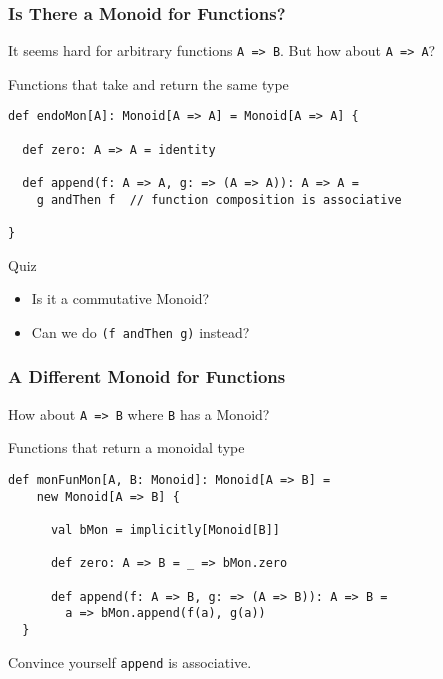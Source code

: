 \documentclass{beamer}
\begin{document}
\begin{frame}[fragile]\frametitle{Is There a Monoid for Functions?}
  It seems hard for arbitrary functions \texttt{A => B}.
  \pause
  But how about \alert{\texttt{A => A}}?

  \pause
  \begin{block}{Functions that take and return the same type}

  \begin{lstlisting}
def endoMon[A]: Monoid[A => A] = Monoid[A => A] {

  def zero: A => A = identity

  def append(f: A => A, g: => (A => A)): A => A =
    g andThen f  // function composition is associative

}
  \end{lstlisting}
  \end{block}
  \begin{block}{Quiz}
    \begin{itemize}
      \item Is it a commutative Monoid?
      \item Can we do \texttt{(f andThen g)} instead?
    \end{itemize}
  \end{block}
\end{frame}


\begin{frame}[fragile]
  \frametitle{A Different Monoid for Functions}
  How about \texttt{A => B} where \alert{\texttt{B} has a Monoid?}

  \begin{block}{Functions that return a monoidal type}
  \begin{lstlisting}
def monFunMon[A, B: Monoid]: Monoid[A => B] =
    new Monoid[A => B] {

      val bMon = implicitly[Monoid[B]]

      def zero: A => B = _ => bMon.zero

      def append(f: A => B, g: => (A => B)): A => B =
        a => bMon.append(f(a), g(a))
  }
  \end{lstlisting}
  \end{block}
  Convince yourself \texttt{append} is associative.
\end{frame}
\end{document}
